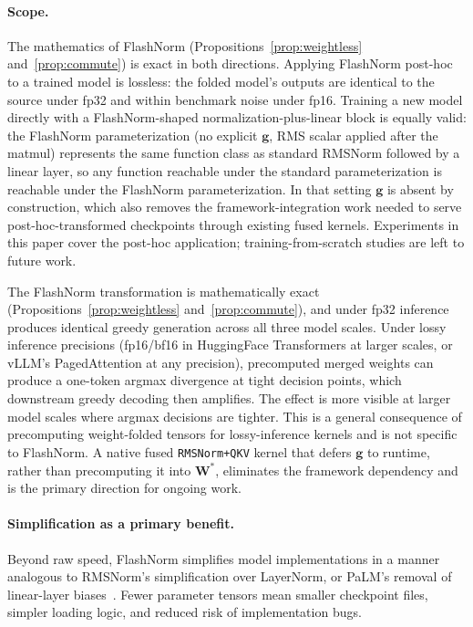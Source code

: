 \documentclass{article}
\begin{document}
\paragraph{Scope.} The mathematics of FlashNorm (Propositions~\ref{prop:weightless} and~\ref{prop:commute}) is exact in both directions. Applying FlashNorm post-hoc to a trained model is lossless: the folded model's outputs are identical to the source under fp32 and within benchmark noise under fp16. Training a new model directly with a FlashNorm-shaped normalization-plus-linear block is equally valid: the FlashNorm parameterization (no explicit $\mathbf{g}$, RMS scalar applied after the matmul) represents the same function class as standard RMSNorm followed by a linear layer, so any function reachable under the standard parameterization is reachable under the FlashNorm parameterization. In that setting $\mathbf{g}$ is absent by construction, which also removes the framework-integration work needed to serve post-hoc-transformed checkpoints through existing fused kernels. Experiments in this paper cover the post-hoc application; training-from-scratch studies are left to future work.

The FlashNorm transformation is mathematically exact (Propositions~\ref{prop:weightless} and~\ref{prop:commute}), and under fp32 inference produces identical greedy generation across all three model scales. Under lossy inference precisions (fp16/bf16 in HuggingFace Transformers at larger scales, or vLLM's PagedAttention at any precision), precomputed merged weights can produce a one-token argmax divergence at tight decision points, which downstream greedy decoding then amplifies. The effect is more visible at larger model scales where argmax decisions are tighter. This is a general consequence of precomputing weight-folded tensors for lossy-inference kernels and is not specific to FlashNorm. A native fused \texttt{RMSNorm+QKV} kernel that defers $\mathbf{g}$ to runtime, rather than precomputing it into $\mathbf{W^\ast}$, eliminates the framework dependency and is the primary direction for ongoing work.

\paragraph{Simplification as a primary benefit.}
Beyond raw speed, FlashNorm simplifies model implementations in a manner analogous
to RMSNorm's simplification over LayerNorm, or PaLM's removal of linear-layer
biases~\citep{PaLM}. Fewer parameter tensors mean smaller checkpoint
files, simpler loading logic, and reduced risk of implementation bugs.
\end{document}
